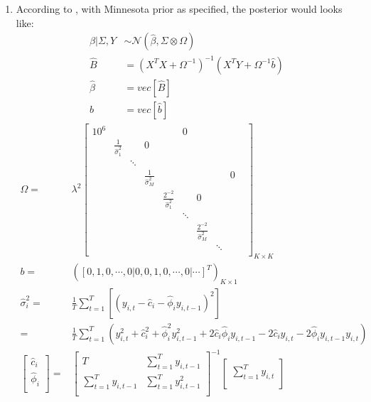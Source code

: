 \documentclass[11pt, oneside]{article}   	%
\begin{document}
\begin{enumerate}[(1)]
\item
According to \cite{giannone2016priors}, with Minnesota prior as specified, the posterior would looks like:
\begin{align}
\beta | \Sigma, Y & \sim \mathcal{N} (\hat{ \beta}, \Sigma \otimes \Omega) \\
\hat {B} &= (X^TX+ \Omega ^{-1}) ^{-1} (X^TY + \Omega ^{-1} \hat{b}) \\
\hat { \beta} & = vec[ \hat {B}] \\
b & = vec[\hat {b}]
\end{align}
\begin{align}
 \Omega = &\lambda^2 
 \begin{bmatrix}
 10^6 & &  & & &  0 &&\\
 & \frac{1}{\hat{ \sigma}^2_1}& &  0& & & &  &\\
  & & \ddots & & & & & \\
  & & & \frac{1}{\hat{ \sigma}_M^2} & && & &0&\\
  & & & &\frac{2 ^{-2}}{\hat{ \sigma}_1^2} &  &0& &\\
    & & & & &\ddots  && &\\
    & & & & &  &\frac{2 ^{-2}}{\hat{ \sigma}_M^2}& & &\\
    & & & & &  & &\ddots & & \\
\end{bmatrix} _{K\times K} \\
b =& ([0,1,0,\cdots,0| 0,0,1,0,\cdots,0|\cdots]^T )_{K \times 1}\\
\hat { \sigma}_i^2 = & \frac{1}{T}\sum_{t=1}^{T} \left[ (y _{i,t}- \hat {c}_i - \hat { \phi}_iy _{i,t-1}) ^{2} \right] \nonumber \\
=& \frac{1}{T}\sum_{t=1}^{T} (y _{i,t}^2+\hat {c}_i^2 + \hat { \phi}_i^2 y _{i,t-1}^2+2\hat {c}_i \hat { \phi}_i y _{i,t-1}- 2\hat {c}_i y _{i,t}-2\hat { \phi}_i y _{i,t-1} y _{i,t})\\ 
 \begin{bmatrix}
 \hat {c}_i \\
 \hat { \phi}_i \\
\end{bmatrix} =&
\begin{bmatrix}
 T & \sum_{t = 1}^{T} y _{i,t-1} \\
 \sum_{t = 1}^{T} y _{i,t-1} & \sum_{t = 1}^{T} y _{i,t-1}^2 \\
\end{bmatrix} ^{-1}
\begin{bmatrix}
\sum_{t = 1}^{T} y _{i,t} \\

\end{bmatrix}
\end{align}
\end{enumerate}
\end{document}
